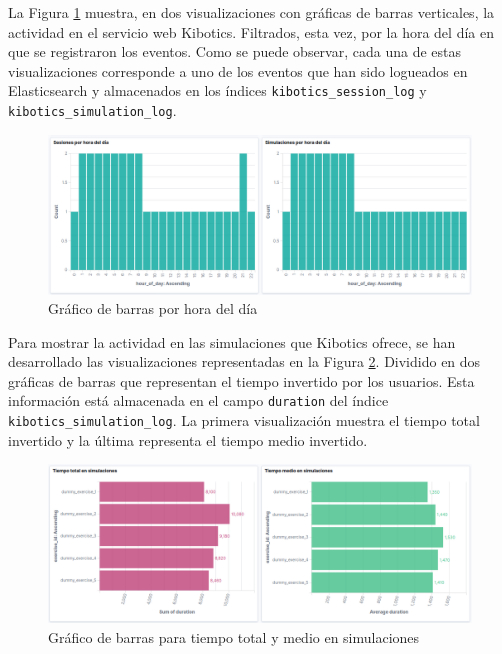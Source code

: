 \documentclass[a4paper, 12pt]{book}
\begin{document}
		La Figura \ref{fig:kibana_hourofday} muestra, en dos visualizaciones con gráficas de barras verticales, la actividad en el servicio web Kibotics. Filtrados, esta vez, por la hora del día en que se registraron los eventos. Como se puede observar, cada una de estas visualizaciones corresponde a uno de los eventos que han sido logueados en Elasticsearch y almacenados en los índices \texttt{kibotics\_session\_log} y \texttt{kibotics\_simulation\_log}.\\
		
		\begin{figure}[H]
			\centering
			\includegraphics[width=14cm, keepaspectratio]{img/kibana_04_hour_of_day}
			\caption{Gráfico de barras por hora del día}
			\label{fig:kibana_hourofday}
		\end{figure}
		\newpage		
		
		Para mostrar la actividad en las simulaciones que Kibotics ofrece, se han desarrollado las visualizaciones representadas en la Figura \ref{fig:kibana_simulations}. Dividido en dos gráficas de barras que representan el tiempo invertido por los usuarios. Esta información está almacenada en el campo \texttt{duration} del índice \texttt{kibotics\_simulation\_log}. La primera visualización muestra el tiempo total invertido y la última representa el tiempo medio invertido.
		\begin{figure}[H]
			\centering
			\includegraphics[width=13cm, keepaspectratio]{img/kibana_05_simulations}
			\caption{Gráfico de barras para tiempo total y medio en simulaciones}
			\label{fig:kibana_simulations}
		\end{figure}
		
\end{document}
